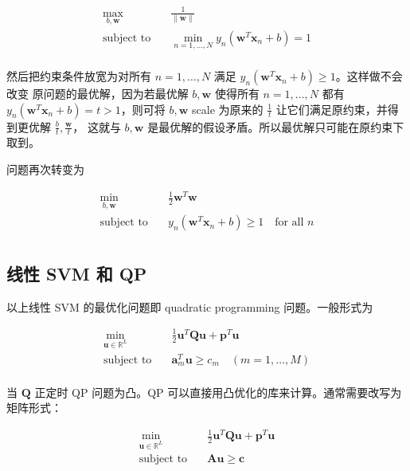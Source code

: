 \documentclass[a4paper]{article}
\begin{document}
\begin{equation}
\begin{aligned}
\max_{b, \mathbf{w}} \quad& \frac{1}{\|\mathbf{w}\|} \\
\text{subject to} \quad& \min_{n=1,\dots,N}y_n(\mathbf{w}^{T}\mathbf{x}_n + b) = 1 \\
\end{aligned}
\end{equation}

然后把约束条件放宽为对所有 $n=1,\dots, N$ 满足 $y_n(\mathbf{w}^{T}\mathbf{x}_n + b) \ge 1$。这样做不会改变
原问题的最优解，因为若最优解 $b, \mathbf{w}$ 使得所有 $n=1,\dots,N$ 都有
$y_n(\mathbf{w}^{T}\mathbf{x}_n + b) = t > 1$，则可将 $b, \mathbf{w}$ scale 为原来的
$\displaystyle \frac{1}{t}$ 让它们满足原约束，并得到更优解 $\displaystyle \frac{b}{t}, \frac{\mathbf{w}}{t}$，
这就与 $b, \mathbf{w}$ 是最优解的假设矛盾。所以最优解只可能在原约束下取到。

问题再次转变为

\begin{equation}
\begin{aligned}
\min_{b, \mathbf{w}} \quad& \frac{1}{2}\mathbf{w}^{T}\mathbf{w} \\
\text{subject to} \quad& y_n(\mathbf{w}^{T}\mathbf{x}_n + b) \ge 1 \quad \text{for all } n\\
\end{aligned}
\end{equation}


\subsection{线性 SVM 和 QP}
以上线性 SVM 的最优化问题即 quadratic programming 问题。一般形式为

\begin{equation}
\begin{aligned}
\min_{\mathbf{u} \in \mathbb{R}^{L}} \quad& \frac{1}{2}\mathbf{u}^{T}\mathbf{Qu} + \mathbf{p}^{T}\mathbf{u} \\
\text{subject to} \quad& \mathbf{a}_m^{T}\mathbf{u} \ge c_m \quad (m = 1, \dots, M)\\
\end{aligned}
\end{equation}

当 $\mathbf{Q}$ 正定时 QP 问题为凸。QP 可以直接用凸优化的库来计算。通常需要改写为矩阵形式：

\begin{equation}
\begin{aligned}
\min_{\mathbf{u} \in \mathbb{R}^{L}} \quad& \frac{1}{2}\mathbf{u}^{T}\mathbf{Qu} + \mathbf{p}^{T}\mathbf{u} \\
\text{subject to} \quad& \mathbf{Au} \ge \mathbf{c}
\end{aligned}
\end{equation}
\end{document}
